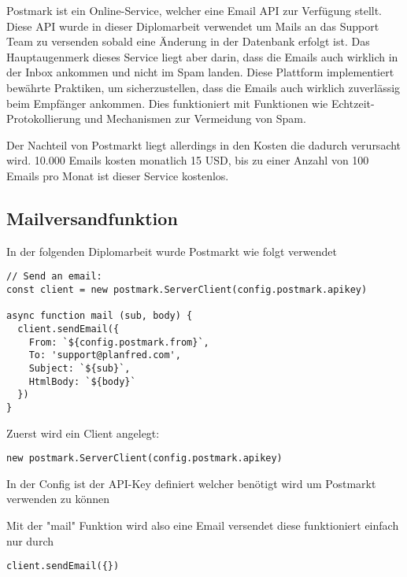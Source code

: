 Postmark ist ein Online-Service, welcher eine Email API zur Verfügung stellt. Diese API wurde in dieser Diplomarbeit verwendet um Mails an das Support Team zu versenden sobald eine Änderung in der Datenbank erfolgt ist. Das Hauptaugenmerk dieses Service liegt aber darin, dass die Emails auch wirklich in der Inbox ankommen und nicht im Spam landen. Diese Plattform implementiert bewährte Praktiken, um sicherzustellen, dass die Emails auch wirklich zuverlässig beim Empfänger ankommen. Dies funktioniert mit Funktionen wie Echtzeit-Protokollierung und Mechanismen zur Vermeidung von Spam.

Der Nachteil von Postmarkt liegt allerdings in den Kosten die dadurch verursacht wird. 10.000 Emails kosten monatlich 15 USD, bis zu einer Anzahl von 100 Emails pro Monat ist dieser Service kostenlos.

\subsection{Mailversandfunktion}

In der folgenden Diplomarbeit wurde Postmarkt wie folgt verwendet


\begin{lstlisting}
// Send an email:
const client = new postmark.ServerClient(config.postmark.apikey)

async function mail (sub, body) {
  client.sendEmail({
    From: `${config.postmark.from}`,
    To: 'support@planfred.com',
    Subject: `${sub}`,
    HtmlBody: `${body}`
  })
}
\end{lstlisting}

Zuerst wird ein Client angelegt:
\begin{lstlisting}
new postmark.ServerClient(config.postmark.apikey)
\end{lstlisting}
In der Config ist der API-Key definiert welcher benötigt wird um Postmarkt verwenden zu können

Mit der "mail" Funktion wird also eine Email versendet diese funktioniert einfach nur durch 
\begin{lstlisting}
client.sendEmail({})
\end{lstlisting}
